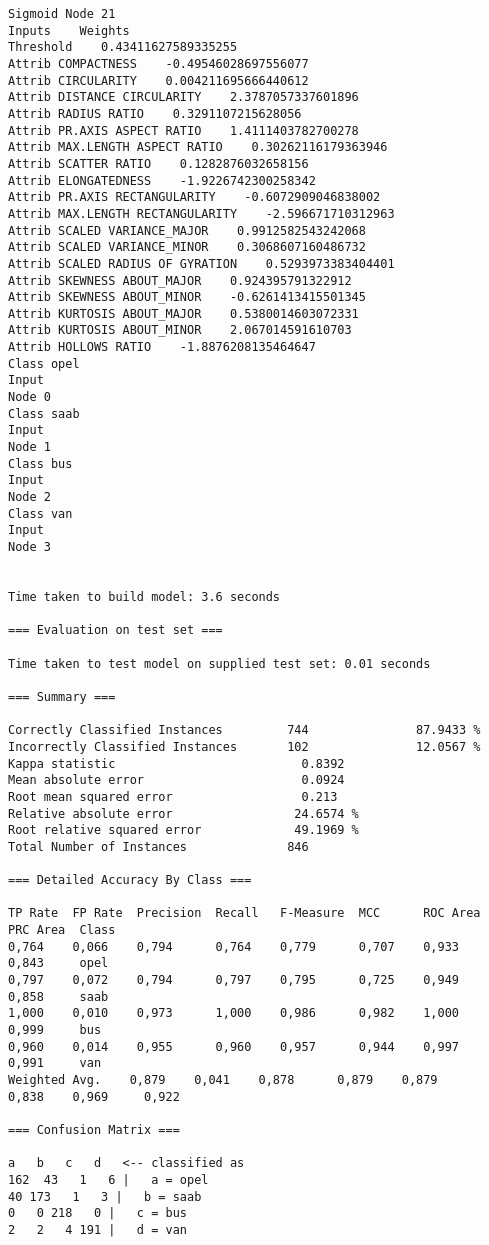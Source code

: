 \documentclass[
	article,			%
	11pt,				%
	oneside,			%
	a4paper,			%
	english,			%
	brazil,				%
	sumario=tradicional
	]{abntex2}
\begin{document}
\begin{lstlisting}
Sigmoid Node 21
Inputs    Weights
Threshold    0.43411627589335255
Attrib COMPACTNESS    -0.49546028697556077
Attrib CIRCULARITY    0.004211695666440612
Attrib DISTANCE CIRCULARITY    2.3787057337601896
Attrib RADIUS RATIO    0.3291107215628056
Attrib PR.AXIS ASPECT RATIO    1.4111403782700278
Attrib MAX.LENGTH ASPECT RATIO    0.30262116179363946
Attrib SCATTER RATIO    0.1282876032658156
Attrib ELONGATEDNESS    -1.9226742300258342
Attrib PR.AXIS RECTANGULARITY    -0.6072909046838002
Attrib MAX.LENGTH RECTANGULARITY    -2.596671710312963
Attrib SCALED VARIANCE_MAJOR    0.9912582543242068
Attrib SCALED VARIANCE_MINOR    0.3068607160486732
Attrib SCALED RADIUS OF GYRATION    0.5293973383404401
Attrib SKEWNESS ABOUT_MAJOR    0.924395791322912
Attrib SKEWNESS ABOUT_MINOR    -0.6261413415501345
Attrib KURTOSIS ABOUT_MAJOR    0.5380014603072331
Attrib KURTOSIS ABOUT_MINOR    2.067014591610703
Attrib HOLLOWS RATIO    -1.8876208135464647
Class opel
Input
Node 0
Class saab
Input
Node 1
Class bus
Input
Node 2
Class van
Input
Node 3


Time taken to build model: 3.6 seconds

=== Evaluation on test set ===

Time taken to test model on supplied test set: 0.01 seconds

=== Summary ===

Correctly Classified Instances         744               87.9433 %
Incorrectly Classified Instances       102               12.0567 %
Kappa statistic                          0.8392
Mean absolute error                      0.0924
Root mean squared error                  0.213 
Relative absolute error                 24.6574 %
Root relative squared error             49.1969 %
Total Number of Instances              846     

=== Detailed Accuracy By Class ===

TP Rate  FP Rate  Precision  Recall   F-Measure  MCC      ROC Area  PRC Area  Class
0,764    0,066    0,794      0,764    0,779      0,707    0,933     0,843     opel
0,797    0,072    0,794      0,797    0,795      0,725    0,949     0,858     saab
1,000    0,010    0,973      1,000    0,986      0,982    1,000     0,999     bus
0,960    0,014    0,955      0,960    0,957      0,944    0,997     0,991     van
Weighted Avg.    0,879    0,041    0,878      0,879    0,879      0,838    0,969     0,922     

=== Confusion Matrix ===

a   b   c   d   <-- classified as
162  43   1   6 |   a = opel
40 173   1   3 |   b = saab
0   0 218   0 |   c = bus
2   2   4 191 |   d = van


\end{lstlisting}
\end{document}
